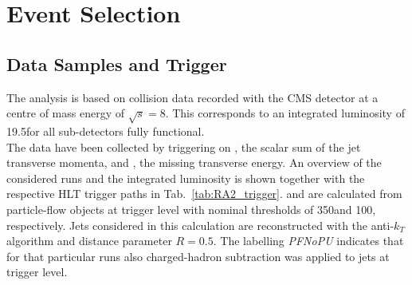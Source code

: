 \section{Event Selection}
\label{sec:RA2_sel}

\subsection{Data Samples and Trigger}
\label{subsec:RA2_samples_trigger}
The analysis is based on \pp collision data recorded with the CMS detector at a centre of mass energy of $\sqrt{s} = 8$\tev. This corresponds to an integrated luminosity of 19.5\fbinv for all sub-detectors fully functional. \\
The data have been collected by triggering on \HT, the scalar sum of the jet transverse momenta, and \met, the missing transverse energy. An overview of the considered runs and the integrated luminosity is shown together with the respective HLT trigger paths in Tab.~\ref{tab:RA2_trigger}. \HT and \met are calculated from particle-flow objects at trigger level with nominal thresholds of 350\gev and 100\gev, respectively. Jets considered in this calculation are reconstructed with the anti-$k_T$ algorithm and distance parameter $R = 0.5$. The labelling \textit{PFNoPU} indicates that for that particular runs also charged-hadron subtraction was applied to jets at trigger level. 
\begin{table}[!b]
\centering
\caption{Utilized signal trigger paths in individual run ranges listed together with the integrated luminosity.}
\label{tab:RA2_trigger}
\end{table}  
\\
